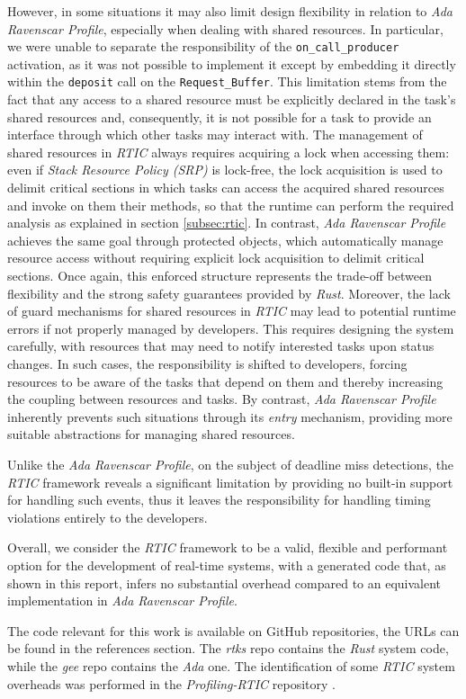 However, in some situations it may also limit design flexibility in relation to
\textit{Ada Ravenscar Profile}, especially when dealing with shared resources.
In particular, we were unable to separate the responsibility of the
\texttt{on\_call\_producer} activation, as it was not possible to implement it 
except by embedding it directly within the \texttt{deposit} call on the
\texttt{Request\_Buffer}. This limitation stems from the fact that any access to
a shared resource must be explicitly declared in the task’s shared resources
and, consequently, it is not possible for a task to provide an interface through
which other tasks may interact with. The management of shared resources in
\textit{RTIC} always requires acquiring a lock when accessing them: even if
\textit{Stack Resource Policy (SRP)} is lock-free, the lock acquisition is used
to delimit critical sections in which tasks can access the acquired shared
resources and invoke on them their methods, so that the runtime can perform the
required analysis as explained in section \ref{subsec:rtic}. In contrast,
\textit{Ada Ravenscar Profile} achieves the same goal through protected objects,
which automatically manage resource access without requiring explicit lock
acquisition to delimit critical sections. Once again, this enforced structure
represents the trade-off between flexibility and the strong safety guarantees
provided by \textit{Rust}. Moreover, the lack of guard mechanisms for shared
resources in \textit{RTIC} may lead to potential runtime errors if not properly
managed by developers. This requires designing the system carefully, with
resources that may need to notify interested tasks upon status changes. In such
cases, the responsibility is shifted to developers, forcing resources to be
aware of the tasks that depend on them and thereby increasing the coupling
between resources and tasks. By contrast, \textit{Ada Ravenscar Profile}
inherently prevents such situations through its \textit{entry} mechanism,
providing more suitable abstractions for managing shared resources.
\label{lab:shared-resource-management-conclusions}

Unlike the \textit{Ada Ravenscar Profile}, on the subject of deadline miss
detections, the \textit{RTIC} framework reveals a significant limitation by
providing no built-in support for handling such events, thus it leaves the
responsibility for handling timing violations entirely to the developers.

Overall, we consider the \textit{RTIC} framework to be a valid, flexible and
performant option for the development of real-time systems, with a generated
code that, as shown in this report, infers no substantial overhead compared to
an equivalent implementation in \textit{Ada Ravenscar Profile}.

The code relevant for this work is available on GitHub repositories, the URLs
can be found in the references section. The \textit{rtks} repo
\cite{prandinTommasoprandinRtks2025} contains the \textit{Rust} system code,
while the \textit{gee} repo \cite{prandinTommasoprandinGee2025} contains the
\textit{Ada} one. The identification of some \textit{RTIC} system overheads was
performed in the \textit{Profiling-RTIC} repository
\cite{bresolinGianlucaBresolinProfilingRTIC2025}.  
